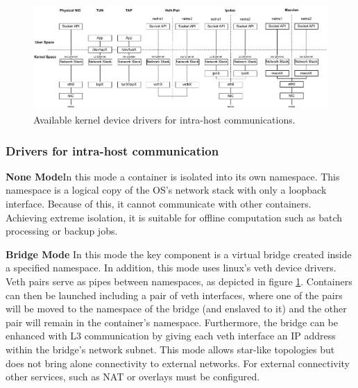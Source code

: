\documentclass[conference]{IEEEtran}
\begin{document}
\begin{figure}[!t]
\centering
\includegraphics[width=\textwidth]{container_network.drawio.pdf}
\caption{Available kernel device drivers for intra-host communications.}
\label{virtual_networks}
\end{figure}


\subsubsection{Drivers for intra-host communication}\hfill\break
\textbf{None Mode}\hspace{0.2cm}In this mode a container is isolated into its own namespace. This namespace is a logical copy of the OS’s network stack with only a loopback interface. Because of this, it cannot communicate with other containers. Achieving extreme isolation, it is suitable for offline computation such as batch processing or backup jobs.

\noindent\textbf{Bridge Mode}\hspace{0.2cm} In this mode the key component is a virtual bridge created inside a specified namespace. In addition, this mode uses linux's veth device drivers. Veth pairs serve as pipes between namespaces, as depicted in figure \ref{virtual_networks}.  Containers can then be launched including a pair of veth interfaces, where one of the pairs will be moved to the namespace of the bridge (and enslaved to it) and the other pair will remain in the container's namespace. Furthermore, the bridge can be enhanced with L3 communication by giving each veth interface an IP address within the bridge's network subnet. This mode allows star-like topologies but does not bring alone connectivity to external networks. For external connectivity other services, such as NAT or overlays must be configured. 
\end{document}

